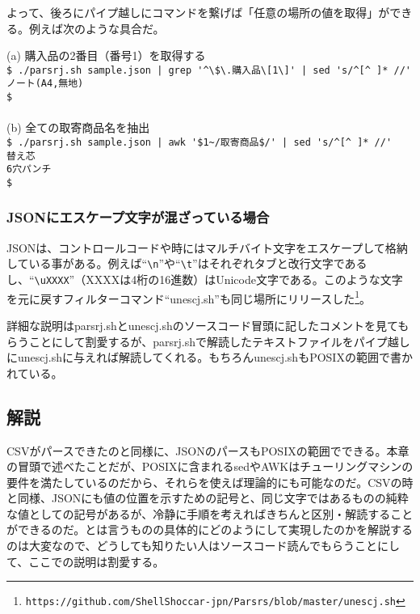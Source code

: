 よって、後ろにパイプ越しにコマンドを繋げば「任意の場所の値を取得」ができる。例えば次のような具合だ。
\begin{screen}
	(a) 購入品の2番目（番号1）を取得する \\
	\verb!$ ./parsrj.sh sample.json | grep '^\$\.購入品\[1\]' | sed 's/^[^ ]* //'! \return \\
	\verb|ノート(A4,無地)| \\
	\verb|$ | \\
	\\
	(b) 全ての取寄商品名を抽出 \\
	\verb!$ ./parsrj.sh sample.json | awk '$1~/取寄商品$/' | sed 's/^[^ ]* //'! \return \\
	\verb|替え芯| \\
	\verb|6穴パンチ| \\
	\verb|$ |
\end{screen}

\subsubsection*{JSONにエスケープ文字が混ざっている場合}

JSONは、コントロールコードや時にはマルチバイト文字をエスケープして格納している事がある。例えば``\verb|\n|''や``\verb|\t|''はそれぞれタブと改行文字であるし、``\verb|\uXXXX|''（XXXXは4桁の16進数）はUnicode文字である。このような文字を元に戻すフィルターコマンド``unescj.sh''も同じ場所にリリースした\footnote{\verb|https://github.com/ShellShoccar-jpn/Parsrs/blob/master/unescj.sh|}。

詳細な説明はparsrj.shとunescj.shのソースコード冒頭に記したコメントを見てもらうことにして割愛するが、parsrj.shで解読したテキストファイルをパイプ越しにunescj.shに与えれば解読してくれる。もちろんunescj.shもPOSIXの範囲で書かれている。

\subsection*{解説}

CSVがパースできたのと同様に、JSONのパースもPOSIXの範囲でできる。本章の冒頭で述べたことだが、POSIXに含まれるsedやAWKはチューリングマシンの要件を満たしているのだから、それらを使えば理論的にも可能なのだ。CSVの時と同様、JSONにも値の位置を示すための記号と、同じ文字ではあるものの純粋な値としての記号があるが、冷静に手順を考えればきちんと区別・解読することができるのだ。とは言うものの具体的にどのようにして実現したのかを解説するのは大変なので、どうしても知りたい人はソースコード読んでもらうことにして、ここでの説明は割愛する。

